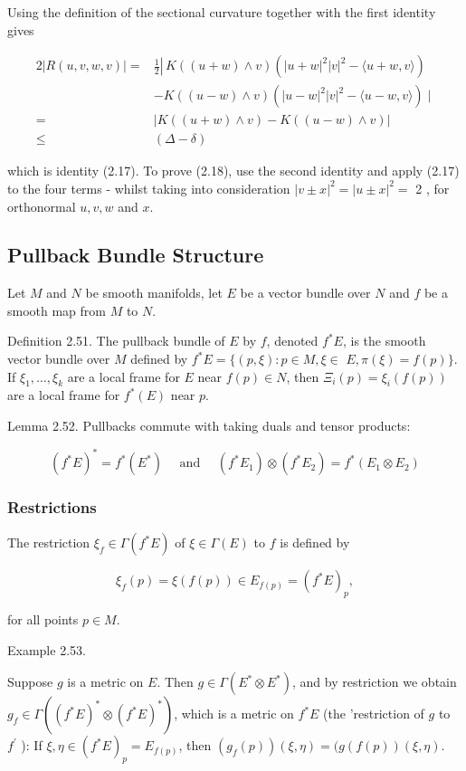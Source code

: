 \documentclass[10pt, letterpaper]{article}
\begin{document}
Using the definition of the sectional curvature together with the first identity gives

$$
\begin{aligned}
2|R(u, v, w, v)|= & \left.\frac{1}{2} \right\rvert\, K((u+w) \wedge v)\left(|u+w|^{2}|v|^{2}-\langle u+w, v\rangle\right) \\
& -K((u-w) \wedge v)\left(|u-w|^{2}|v|^{2}-\langle u-w, v\rangle\right) \mid \\
= & |K((u+w) \wedge v)-K((u-w) \wedge v)| \\
\leq & (\Delta-\delta)
\end{aligned}
$$

which is identity (2.17). To prove (2.18), use the second identity and apply (2.17) to the four terms - whilst taking into consideration $|v \pm x|^{2}=|u \pm x|^{2}=$ 2 , for orthonormal $u, v, w$ and $x$.

\subsection*{Pullback Bundle Structure}
Let $M$ and $N$ be smooth manifolds, let $E$ be a vector bundle over $N$ and $f$ be a smooth map from $M$ to $N$.

Definition 2.51. The pullback bundle of $E$ by $f$, denoted $f^{*} E$, is the smooth vector bundle over $M$ defined by $f^{*} E=\{(p, \xi): p \in M, \xi \in$ $E, \pi(\xi)=f(p)\}$. If $\xi_{1}, \ldots, \xi_{k}$ are a local frame for $E$ near $f(p) \in N$, then $\Xi_{i}(p)=\xi_{i}(f(p))$ are a local frame for $f^{*}(E)$ near $p$.

Lemma 2.52. Pullbacks commute with taking duals and tensor products:

$$
\left(f^{*} E\right)^{*}=f^{*}\left(E^{*}\right) \quad \text { and } \quad\left(f^{*} E_{1}\right) \otimes\left(f^{*} E_{2}\right)=f^{*}\left(E_{1} \otimes E_{2}\right)
$$

\subsubsection*{Restrictions}
The restriction $\xi_{f} \in \Gamma\left(f^{*} E\right)$ of $\xi \in \Gamma(E)$ to $f$ is defined by

$$
\xi_{f}(p)=\xi(f(p)) \in E_{f(p)}=\left(f^{*} E\right)_{p},
$$

for all points $p \in M$.

Example 2.53. 

Suppose $g$ is a metric on $E$. Then $g \in \Gamma\left(E^{*} \otimes E^{*}\right)$, and by restriction we obtain $g_{f} \in \Gamma\left(\left(f^{*} E\right)^{*} \otimes\left(f^{*} E\right)^{*}\right)$, which is a metric on $f^{*} E$ (the 'restriction of $g$ to $f^{\prime}$ ): If $\xi, \eta \in\left(f^{*} E\right)_{p}=E_{f(p)}$, then $\left(g_{f}(p)\right)(\xi, \eta)=(g(f(p))(\xi, \eta)$.
\end{document}
